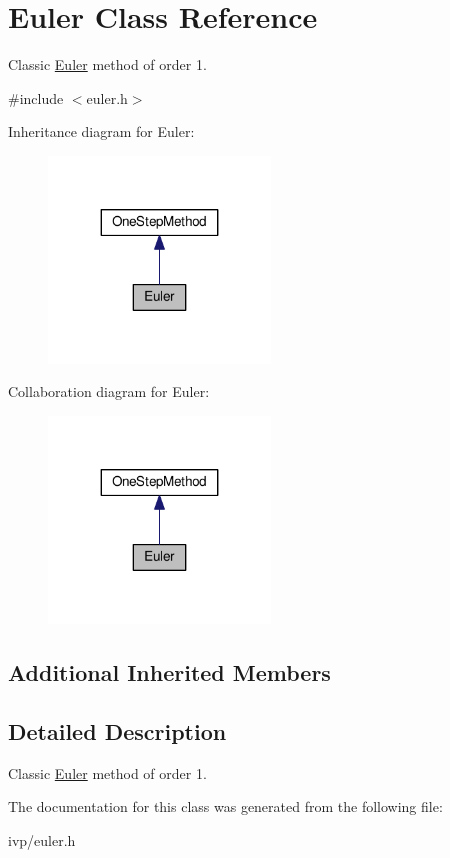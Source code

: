 \hypertarget{classEuler}{}\section{Euler Class Reference}
\label{classEuler}


Classic \hyperlink{classEuler}{Euler} method of order 1.  




{\ttfamily \#include $<$euler.\+h$>$}



Inheritance diagram for Euler\+:\nopagebreak
\begin{figure}[H]
\begin{center}
\leavevmode
\includegraphics[width=167pt]{classEuler__inherit__graph}
\end{center}
\end{figure}


Collaboration diagram for Euler\+:\nopagebreak
\begin{figure}[H]
\begin{center}
\leavevmode
\includegraphics[width=167pt]{classEuler__coll__graph}
\end{center}
\end{figure}
\subsection*{Additional Inherited Members}


\subsection{Detailed Description}
Classic \hyperlink{classEuler}{Euler} method of order 1. 

The documentation for this class was generated from the following file\+:\begin{DoxyCompactItemize}
\item 
ivp/euler.\+h\end{DoxyCompactItemize}
